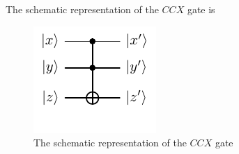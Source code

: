 The schematic representation of the $CCX$ gate is

\begin{figure}[ht]
    \centering
    \includegraphics{images/3_Quantum_Computing/ccx_gate.pdf}
    \caption{The schematic representation of the $CCX$ gate}
\end{figure}
